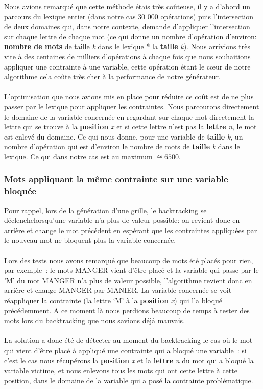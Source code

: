 \documentclass [ 11 pt ] {article}
\begin{document}
            Nous avions remarqué que cette méthode étais très coûteuse, il y a d’abord un parcours du lexique entier (dans notre cas 30 000 opérations) puis l’intersection de deux domaines qui, dans notre contexte, demande d’appliquer l’intersection sur chaque lettre de chaque mot (ce qui donne un nombre d’opération d’environ: \textbf{nombre de mots} de taille \textit{k}  dans le lexique * la \textbf{taille} \textit{k}). Nous arrivions très vite à des centaines de milliers d’opérations à chaque fois que nous souhaitions appliquer une contrainte à une variable, cette opération étant le cœur de notre algorithme cela coûte très cher à la performance de notre générateur.
            \\\\
            L’optimisation que nous avions mis en place pour réduire ce coût est de ne plus passer par le lexique pour appliquer les contraintes. Nous parcourons directement le domaine de la variable concernée en regardant sur chaque mot directement la lettre qui se trouve à la \textbf{position} \textit{x} et si cette lettre n’est pas la \textbf{lettre} \textit{n}, le mot est enlevé du domaine. Ce qui nous donne, pour une variable de \textbf{taille} \textit{k}, un nombre d’opération qui est d’environ le nombre de mots de \textbf{taille} \textit{k}  dans le lexique. Ce qui dans notre cas est au maximum $\cong6500$.
        \subsubsection{Mots appliquant la même contrainte sur une variable bloquée}
            Pour rappel, lors de la génération d’une grille, le backtracking \guillemotleft se déclenche\guillemotright   lorsqu’une variable n’a plus de valeur possible: on revient donc en arrière et change le mot précédent en espérant que les contraintes appliquées par le nouveau mot ne bloquent plus la variable concernée.
            \\\\
            Lors des tests nous avons remarqué que beaucoup de mots été placés pour rien, par exemple : le mots MANGER vient d’être placé et la variable qui passe par le 'M' du mot MANGER n’a plus de valeur possible, l’algorithme revient donc en arrière et change MANGER par MANIER. La variable concernée se voit réappliquer la contrainte (la lettre ‘M’ à la \textbf{position} \textit{x}) qui l’a bloqué précédemment. A ce moment là nous perdions beaucoup de temps à tester des mots lors du backtracking que nous savions déjà \guillemotleft mauvais\guillemotright.
            \\\\
            La solution a donc été de détecter au moment du backtracking le cas où le mot qui vient d’être placé à appliqué une contrainte qui a bloqué une variable : si c’est le cas nous récupérons la \textbf{position} \textit{x} et la \textbf{lettre} \textit{n} du mot qui a bloqué la variable victime, et nous enlevons tous les mots qui ont cette lettre à cette position, dans le domaine de la variable qui a posé la contrainte problématique.
\end{document}
